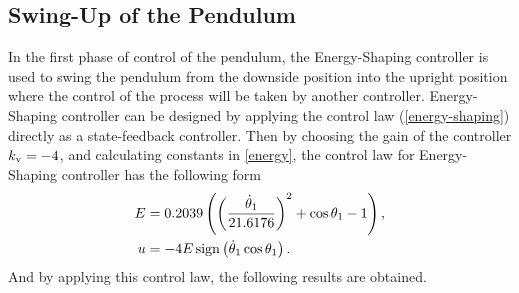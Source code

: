 \subsection{Swing-Up of the Pendulum}
In the first phase of control of the pendulum, the Energy-Shaping controller is used to swing the pendulum from the downside position into the upright position where the control of the process will be taken by another controller. 
Energy-Shaping controller can be designed by applying the control law (\ref{energy-shaping}) directly as a state-feedback controller. Then by choosing the gain of the controller $k _{\text{v}} = -4$, and calculating constants in \ref{energy}, the control law for Energy-Shaping controller has the following form
\begin{subequations}
	\begin{align}
			E &= 0.2039\left( \left( \frac{\dot{\theta}_1}{21.6176} \right)^2+\cos\theta_1 - 1 \right),\\
			u &= -4E\,\mathrm{sign}\left( \dot{\theta}_1\cos\theta_1 \right).
	\end{align}
\end{subequations}
And by applying this control law, the following results are obtained.
